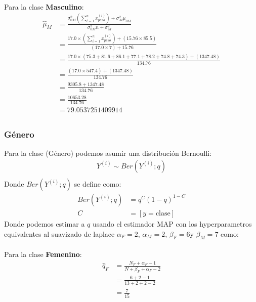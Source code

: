 \documentclass[12pt]{article}
\begin{document}
\paragraph{} Para la clase \textbf{Masculino}:
\begin{equation}
\begin{split}
\hat{\mu}_{M}&=\frac{\sigma_{0M}^2(\sum_{i=1}^{n}{x_{peso}^{(i)}}) + \sigma_M^2\mu_{0M} }{\sigma_{0M}^2n + \sigma_M^2}\\
&=\frac{17.0\times(\sum_{i=1}^{n}{x_{peso}^{(i)}}) + (15.76\times 85.5) }{(17.0 \times 7) + 15.76}\\
&=\frac{17.0\times(75.3 + 81.6 + 86.1 + 77.1 + 78.2 + 74.8 + 74.3) + (1347.48) }{134.76}\\
&=\frac{(17.0\times 547.4) + (1347.48) }{134.76}\\
&=\frac{9305.8 + 1347.48}{134.76}\\
&=\frac{10653.28}{134.76}\\
&= 79.0537251409914\\
\end{split}
\end{equation}
\subsubsection{Género}
Para la clase (Género) podemos asumir una distribución Bernoulli:
\begin{equation}
\begin{split}
Y^{(i)}\sim Ber(Y^{(i)};q)\\
\end{split}
\end{equation}
Donde $Ber(Y^{(i)};q)$ se define como:\\
\begin{equation}
\begin{split}
Ber(Y^{(i)};q)&= q^C(1 - q)^{1-C}\\
C &= [y = \text{clase}]
\end{split}
\end{equation}
Donde podemos estimar a $q$ usando el estimador MAP con los hyperparametros equivalentes al suavizado de laplace $\alpha_F = 2$, $\alpha_M = 2$, $\beta_F = 6$y $\beta_M = 7$ como:\\
\paragraph{}Para la clase \textbf{Femenino}:
\begin{equation}
\begin{split}
\hat{q}_F &= \frac{N_F + \alpha_F - 1}{N + \beta_F + \alpha_F - 2}\\
&= \frac{6 + 2 - 1}{13 + 2 + 2 - 2}\\
&= \frac{7}{15}\\
\end{split}
\end{equation}
\end{document}
